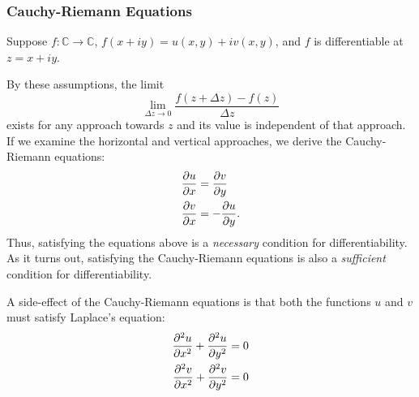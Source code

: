 \documentclass[10pt]{scrartcl}
\numberwithin{equation}{subsection}
\theoremstyle{definition}
\theoremstyle{remark}
\newcommand{\Complex}{\mathbb{C}}
\begin{document}
\subsubsection{Cauchy-Riemann Equations}
Suppose $f:\Complex \to \Complex$, $f(x+iy) = u(x,y) + i v(x,y)$, 
and $f$ is differentiable at $z=x+iy$. 

By these assumptions, the limit
\[
\lim_{\Delta z \to 0} \frac{f(z+\Delta z) - f(z)}{\Delta z}
\] exists for any approach towards $z$ and its value is 
independent of that approach.
If we examine the horizontal and vertical approaches, 
we derive the Cauchy-Riemann equations:
\begin{align}
\pdv{u}{x} &= \pdv{v}{y}\\
\pdv{v}{x} &= -\pdv{u}{y}.
\end{align}
Thus, satisfying the equations above is a \emph{necessary} condition for
differentiability.  As it turns out, satisfying the Cauchy-Riemann equations
is also a \emph{sufficient} condition for differentiability.

A side-effect of the Cauchy-Riemann equations is that both the functions $u$ and $v$
must satisfy Laplace's equation:
\begin{align}
\pdv[2]{u}{x} + \pdv[2]{u}{y} &= 0\\
\pdv[2]{v}{x} + \pdv[2]{v}{y} &= 0
\end{align}
\end{document}
